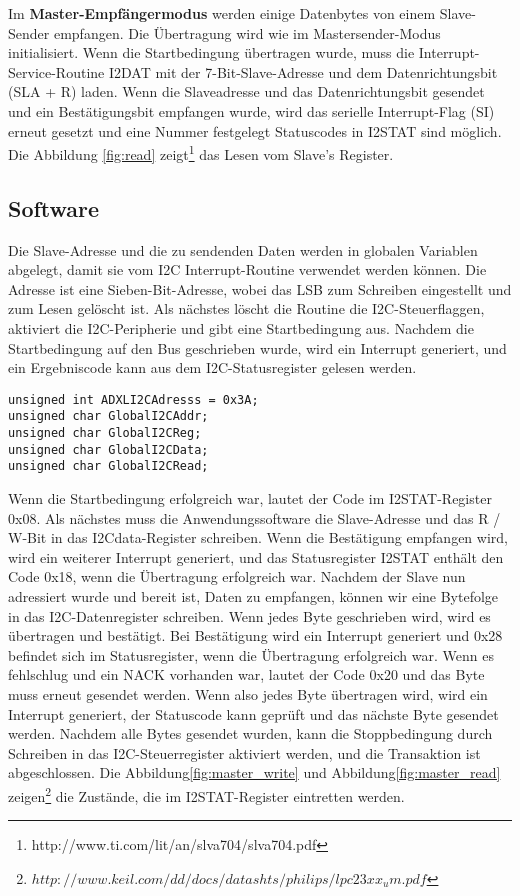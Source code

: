 Im \textbf{Master-Empfängermodus} werden einige Datenbytes von einem Slave-Sender empfangen. Die Übertragung wird wie im Mastersender-Modus initialisiert. Wenn die Startbedingung übertragen wurde, muss die Interrupt-Service-Routine I2DAT mit der 7-Bit-Slave-Adresse und dem Datenrichtungsbit (SLA + R) laden. Wenn die Slaveadresse und das Datenrichtungsbit gesendet und ein Bestätigungsbit empfangen wurde, wird das serielle Interrupt-Flag (SI) erneut gesetzt und eine Nummer festgelegt Statuscodes in I2STAT sind möglich. Die Abbildung \ref{fig:read} zeigt\footnote{http://www.ti.com/lit/an/slva704/slva704.pdf} das Lesen vom Slave's Register.\\

\subsection{Software}
Die Slave-Adresse und die zu sendenden Daten werden in globalen Variablen abgelegt, damit sie vom I2C Interrupt-Routine verwendet werden können. Die Adresse ist eine Sieben-Bit-Adresse, wobei das LSB zum Schreiben eingestellt und zum Lesen gelöscht ist. Als nächstes löscht die Routine die I2C-Steuerflaggen, aktiviert die I2C-Peripherie und gibt eine Startbedingung aus. Nachdem die Startbedingung auf den Bus geschrieben wurde, wird ein Interrupt generiert, und ein Ergebniscode kann aus dem I2C-Statusregister gelesen werden.

\begin{lstlisting}
unsigned int ADXLI2CAdresss = 0x3A;
unsigned char GlobalI2CAddr;
unsigned char GlobalI2CReg;
unsigned char GlobalI2CData;
unsigned char GlobalI2CRead;
\end{lstlisting}

Wenn die Startbedingung erfolgreich war, lautet der Code im I2STAT-Register 0x08. Als nächstes muss die Anwendungssoftware die Slave-Adresse und das R / W-Bit in das I2Cdata-Register schreiben. Wenn die Bestätigung empfangen wird, wird ein weiterer Interrupt generiert, und das Statusregister I2STAT enthält den Code 0x18, wenn die Übertragung erfolgreich war. Nachdem der Slave nun adressiert wurde und bereit ist, Daten zu empfangen, können wir eine Bytefolge in das I2C-Datenregister schreiben. Wenn jedes Byte geschrieben wird, wird es übertragen und bestätigt. Bei Bestätigung wird ein Interrupt generiert und 0x28 befindet sich im Statusregister, wenn die Übertragung erfolgreich war. Wenn es fehlschlug und ein NACK vorhanden war, lautet der Code 0x20 und das Byte muss erneut gesendet werden. Wenn also jedes Byte übertragen wird, wird ein Interrupt generiert, der Statuscode kann geprüft und das nächste Byte gesendet werden. Nachdem alle Bytes gesendet wurden, kann die Stoppbedingung durch Schreiben in das I2C-Steuerregister aktiviert werden, und die Transaktion ist abgeschlossen. Die Abbildung\ref{fig:master_write} und  Abbildung\ref{fig:master_read} zeigen\footnote{$http://www.keil.com/dd/docs/datashts/philips/lpc23xx_um.pdf$} die Zustände, die im I2STAT-Register eintretten werden. 

